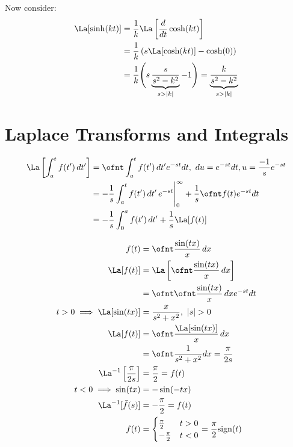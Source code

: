 \documentclass[cplx.tex]{subfiles}
\begin{document}
Now consider:
\begin{align}
    \La[\sinh(kt)] &= \frac{1}{k}\La\left[\frac{d}{dt}\cosh(kt)\right] \\
                   &= \frac{1}{k}\left(s\La[\cosh(kt)] - \cosh(0)\right) \\
                   &= \frac{1}{k} \Bigg(s\underbrace{\frac{s}{s^2-k^2}}_{s>|k|} - 1\Bigg) = \underbrace{\frac{k}{s^2-k^2}}_{s>|k|}
\end{align}

\section{Laplace Transforms and Integrals}
\begin{align}
    \La\left[\int_a^t f(t')\,dt'\right] &= \ofnt \int_a^t f(t')\,dt'e^{-st}dt,~ du = e^{-st}dt,u=\frac{-1}{s}e^{-st} \\
                                        &= -\frac{1}{s}\int_a^t f(t')\,dt'\,e^{-st}\Bigg|_0^\infty + \frac{1}{s}\ofnt f(t)e^{-st}dt \\
                                        &= -\frac{1}{s}\int_0^a f(t')\,dt' + \frac{1}{s}\La[f(t)]
\end{align}

\begin{example}
    \begin{align}
        f(t) &= \ofnt \frac{\sin(tx)}{x}\,dx \\
        \La[f(t)] &= \La\left[\ofnt \frac{\sin(tx)}{x}\,dx\right] \\
                  &= \ofnt \ofnt \frac{\sin(tx)}{x}\,dx e^{-st}dt \\
        t > 0 \implies \La[\sin(tx)] &= \frac{x}{s^2+x^2},~ |s|>0 \\
        \La[f(t)] &= \ofnt \frac{\La[\sin(tx)]}{x}\,dx \\
                  &= \ofnt \frac{1}{s^2+x^2}dx = \frac{\pi}{2s} \\
        \La^{-1}\left[\frac{\pi}{2s}\right] &= \frac{\pi}{2} = f(t) \\
        t < 0 \implies \sin(tx) &= -\sin(-tx) \\
        \La^{-1}[\bar{f}(s)] &= -\frac{\pi}{2} = f(t) \\
        f(t) &= \begin{cases} \frac{\pi}{2} & t > 0 \\ -\frac{\pi}{2} & t < 0\end{cases} = \frac{\pi}{2}\text{sign}(t)
    \end{align}
\end{example}
\end{document}
